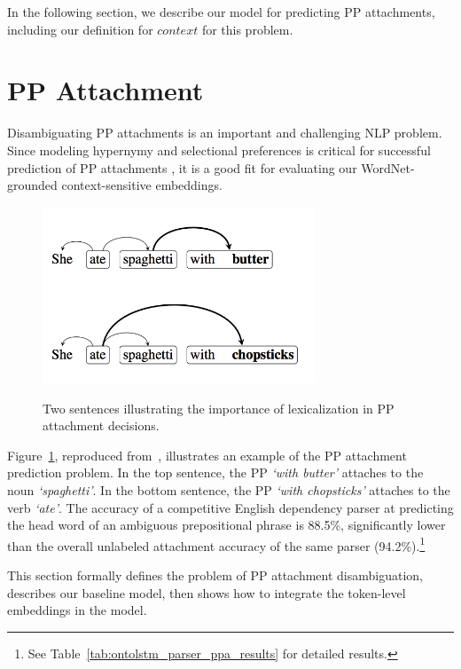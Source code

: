 In the following section, we describe our model for predicting PP attachments,
including our definition for $\textit{context}$ for this problem.

\section{PP Attachment}\label{sec:ontolstm_pp_model} Disambiguating PP
attachments is an important and challenging NLP problem. Since modeling
hypernymy and selectional preferences is critical for successful prediction of
PP attachments \citep{resnik:93}, it is a good fit for evaluating our
WordNet-grounded context-sensitive embeddings.

\begin{figure}[t] \begin{center}
\includegraphics[width=3.2in]{figures/pp_attachment_example.png}\label{fig:ontolstm_pp_example}
\caption{Two sentences illustrating the importance of lexicalization in PP
attachment decisions.} \end{center} \end{figure}

Figure~\ref{fig:ontolstm_pp_example}, reproduced
from~\cite{belinkov2014exploring}, illustrates an example of the PP attachment
prediction problem.  In the top sentence, the PP \textit{`with butter'} attaches
to the noun \textit{`spaghetti'}.  In the bottom sentence, the PP \textit{`with
chopsticks'} attaches to the verb \textit{`ate'}.  The accuracy of a competitive
English dependency parser at predicting the head word of an ambiguous
prepositional phrase is 88.5\%, significantly lower than the overall unlabeled
attachment accuracy of the same parser (94.2\%).\footnote{See
Table~\ref{tab:ontolstm_parser_ppa_results} for detailed results.}

This section formally defines the problem of PP attachment disambiguation,
describes our baseline model, then shows how to integrate the token-level
embeddings in the model.

